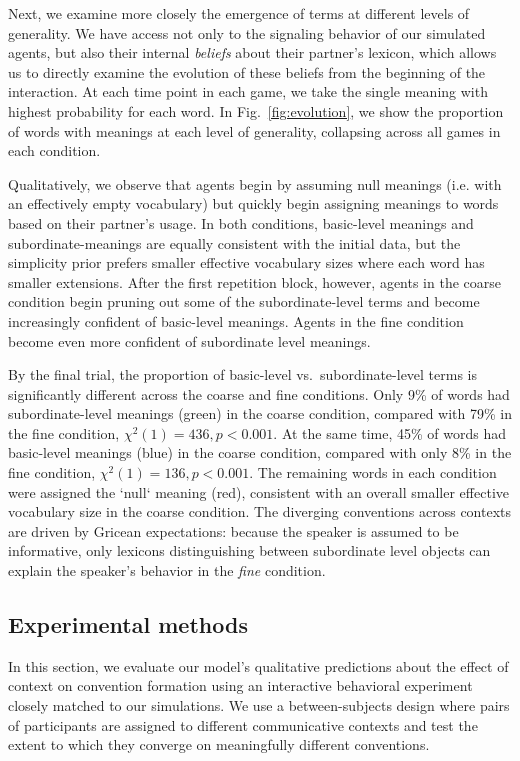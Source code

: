 Next, we examine more closely the emergence of terms at different levels of generality.
We have access not only to the signaling behavior of our simulated agents, but also their internal \emph{beliefs} about their partner's lexicon, which allows us to directly examine the evolution of these beliefs from the beginning of the interaction.
At each time point in each game, we take the single meaning with highest probability for each word.
In Fig.~\ref{fig:evolution}, we show the proportion of words with meanings at each level of generality, collapsing across all games in each condition.


Qualitatively, we observe that agents begin by assuming null meanings (i.e. with an effectively empty vocabulary) but quickly begin assigning meanings to words based on their partner's usage.
In both conditions, basic-level meanings and subordinate-meanings are equally consistent with the initial data, but the simplicity prior prefers smaller effective vocabulary sizes where each word has smaller extensions.
After the first repetition block, however, agents in the coarse condition begin pruning out some of the subordinate-level terms and become increasingly confident of basic-level meanings.
Agents in the fine condition become even more confident of subordinate level meanings.

By the final trial, the proportion of basic-level vs.~subordinate-level terms is significantly different across the coarse and fine conditions.
Only 9\% of words had subordinate-level meanings (green) in the coarse condition, compared with 79\% in the fine condition, $\chi^2(1) = 436, p < 0.001$.
At the same time, 45\% of words had basic-level meanings (blue) in the coarse condition, compared with only 8\% in the fine condition, $\chi^2(1) = 136, p < 0.001$.
The remaining words in each condition were assigned the `null` meaning (red), consistent with an overall smaller effective vocabulary size in the coarse condition.
The diverging conventions across contexts are driven by Gricean expectations: because the speaker is assumed to be informative, only lexicons distinguishing between subordinate level objects can explain the speaker's behavior in the \emph{fine} condition.

\subsection{Experimental methods}

In this section, we evaluate our model's qualitative predictions about the effect of context on convention formation using an interactive behavioral experiment closely matched to our simulations.
We use a between-subjects design where pairs of participants are assigned to different communicative contexts and test the extent to which they converge on meaningfully different conventions.

